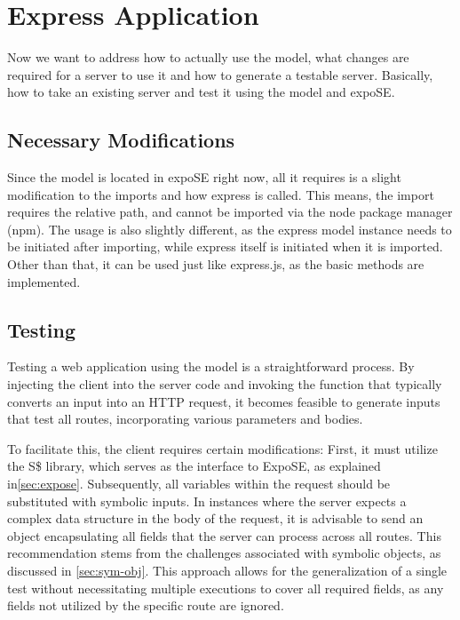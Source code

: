 


\section{Express Application}
\label{sec:exp-app}
Now we want to address how to actually use the model, what changes are required for a server to use it and how to generate a testable server.
Basically, how to take an existing server and test it using the model and expoSE.


\subsection{Necessary Modifications} 
\label{sec:nec-mods}

Since the model is located in expoSE right now, all it requires is a slight modification to the imports and how express is called. This means, the import requires the relative path, and cannot be imported via the node package manager (npm). 
The usage is also slightly different, as the express model instance needs to be initiated after importing, while express itself is initiated when it is imported. 
Other than that, it can be used just like express.js, as the basic methods are implemented.



\subsection{Testing} 
\label{sec:app-testing}

Testing a web application using the model is a straightforward process.  By injecting the client into the server code and invoking the function that typically converts an input into an HTTP request, it becomes feasible to generate inputs that test all routes, incorporating various parameters and bodies.

To facilitate this, the client requires certain modifications: First, it must utilize the S\$ library, which serves as the interface to ExpoSE, as explained in\autoref{sec:expose}. Subsequently, all variables within the request should be substituted with symbolic inputs. In instances where the server expects a complex data structure in the body of the request, it is advisable to send an object encapsulating all fields that the server can process across all routes. This recommendation stems from the challenges associated with symbolic objects, as discussed in \autoref{sec:sym-obj}. 
This approach allows for the generalization of a single test without necessitating multiple executions to cover all required fields, as any fields not utilized by the specific route are ignored.

